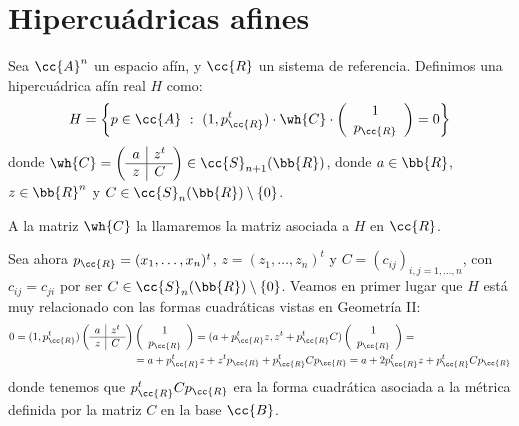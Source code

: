 \chapter{Hipercuádricas afines}

\begin{definicion}
    Sea $\cc{A}^n$ un espacio afín, y $\cc{R}$ un sistema de referencia. Definimos una hipercuádrica afín real $H$ como:
    \begin{equation*}
        H = \left\{p\in \cc{A} ~:~ (1,p_{\cc{R}}^t) \cdot \wh{C} \cdot \left(\begin{array}{c}
            1 \\ p_{\cc{R}}
        \end{array}\right) = 0\right\}
    \end{equation*}
    donde $\wh{C}=\left(\begin{array}{c|c}
        a & z^t \\ \hline
        z & C
    \end{array}\right)\in \cc{S}_{n+1}(\bb{R})$, donde $a\in \bb{R}$, $z\in \bb{R}^n$ y $C\in \cc{S}_{n}(\bb{R})\setminus \{0\}$.

    A la matriz $\wh{C}$ la llamaremos la matriz asociada a $H$ en $\cc{R}$.
\end{definicion}

Sea ahora $p_\cc{R} = (x_1,\dots,x_n)^t$, $z=(z_1,\dots,z_n)^t$ y $C=(c_{ij})_{i,j=1,\dots,n}$, con $c_{ij} = c_{ji}$ por ser $C\in \cc{S}_{n}(\bb{R})\setminus \{0\}$. Veamos en primer lugar que $H$ está muy relacionado con las formas cuadráticas vistas en Geometría II:
\begin{equation*}\begin{split}
    0=(1, p_{\cc{R}}^t)\left(\begin{array}{c|c}
        a & z^t \\ \hline
        z & C
    \end{array}\right)&\left(\begin{array}{c}
        1 \\ p_{\cc{R}}
    \end{array}\right) = 
    (a + p_{\cc{R}}^tz, z^t + p_{\cc{R}}^tC)\left(\begin{array}{c}
        1 \\ p_{\cc{R}}
    \end{array}\right)
    =\\&= a + p_{\cc{R}}^tz + z^tp_{\cc{R}} + p_{\cc{R}}^tCp_{\cc{R}}
    = a + 2p_{\cc{R}}^tz + p_{\cc{R}}^tCp_{\cc{R}}
\end{split}\end{equation*}
donde tenemos que $p_{\cc{R}}^tCp_{\cc{R}}$ era la forma cuadrática asociada a la métrica definida por la matriz $C$ en la base $\cc{B}$.

